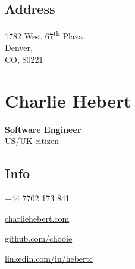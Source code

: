 \noindent\begin{minipage}[t]{0.333\textwidth}  
  \subsection*{Address}
  1782 West 67\textsuperscript{th} Plaza,\\
  Denver,\\
  CO, 80221\\
\end{minipage}
\noindent\begin{minipage}[t]{0.333\textwidth}
  \center
  \section*{Charlie Hebert}
  \textbf{Software Engineer}\\
  US/UK citizen
\end{minipage}
\noindent\begin{minipage}[t]{0.333\textwidth}
  \begin{flushright}
    \section*{Info}
  \end{flushright}

  \begin{description}
    \raggedleft
    \item[Mob] +44 7702 173 841
    \item[Web] \href{http://www.charliehebert.com}{charliehebert.com}
    \item[Github] \href{http://www.github.com/chooie}{github.com/chooie}
    \item[LinkedIn] \href{http://linkedin.com/in/hebertc}{linkedin.com/in/hebertc}
  \end{description}
\end{minipage}

